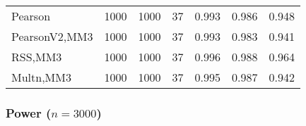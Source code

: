\documentclass[
]{article}
\begin{document}
\begin{table}[H]
{\begin{tabular}[t]{lrrrrrr}
\hspace{1em}Pearson & 1000 & 1000 & 37 & 0.993 & 0.986 & 0.948\\
\hspace{1em}PearsonV2,MM3 & 1000 & 1000 & 37 & 0.993 & 0.983 & 0.941\\
\hspace{1em}RSS,MM3 & 1000 & 1000 & 37 & 0.996 & 0.988 & 0.964\\
\hspace{1em}Multn,MM3 & 1000 & 1000 & 37 & 0.995 & 0.987 & 0.942\\
\bottomrule
\end{tabular}}
\end{table}

\hypertarget{power-n3000-1}{%
\subsubsection{\texorpdfstring{Power
(\(n=3000\))}{Power (n=3000)}}\label{power-n3000-1}}
\end{document}
